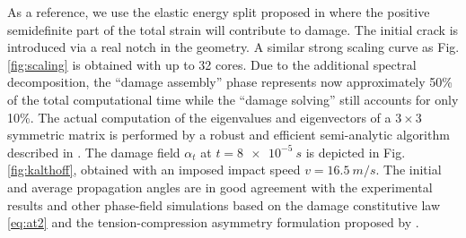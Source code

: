 As a reference, we use the elastic energy split proposed in \cite{FreddiRoyer-Carfagni:2010} where the positive semidefinite part of the total strain will contribute to damage. The initial crack is introduced via a real notch in the geometry. A similar strong scaling curve as Fig. \ref{fig:scaling} is obtained with up to 32 cores. Due to the additional spectral decomposition, the ``damage assembly'' phase represents now approximately 50\% of the total computational time while the ``damage solving'' still accounts for only 10\%. The actual computation of the eigenvalues and eigenvectors of a $3\times 3$ symmetric matrix is performed by a robust and efficient semi-analytic algorithm described in \cite{Scherzinger:2008aa}. The damage field $\alpha_t$ at $t=\SI{8e-5}{s}$ is depicted in Fig. \ref{fig:kalthoff}, obtained with an imposed impact speed $v=\SI{16.5}{m/s}$. The initial and average propagation angles are in good agreement with the experimental results and other phase-field simulations \cite{BordenVerhooselScottHughesLandis:2012,HofackerMiehe:2012} based on the damage constitutive law \eqref{eq:at2} and the tension-compression asymmetry formulation proposed by \cite{MieheHofackerWelschinger:2010}.


